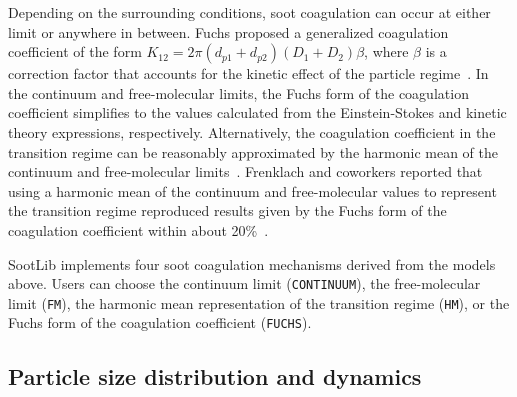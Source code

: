 \documentclass[preprint,letterpaper]{elsarticle}
\begin{document}
Depending on the surrounding conditions, soot coagulation can occur at either limit or anywhere in between. Fuchs proposed a generalized coagulation coefficient of the form $K_{12}=2\pi (d_{p1}+d_{p2})(D_1+D_2)\beta$, where $\beta$ is a correction factor that accounts for the kinetic effect of the particle regime~\cite{Fuchs_1964, Seinfeld_2016}. In the continuum and free-molecular limits, the Fuchs form of the coagulation coefficient simplifies to the values calculated from the Einstein-Stokes and kinetic theory expressions, respectively. Alternatively, the coagulation coefficient in the transition regime can be reasonably approximated by the harmonic mean of the continuum and free-molecular limits~\cite{Kazakov_1998,Frenklach_2002b}. Frenklach and coworkers reported that using a harmonic mean of the continuum and free-molecular values to represent the transition regime reproduced results given by the Fuchs form of the coagulation coefficient within about 20\%~\cite{Frenklach_2002b}.

SootLib implements four soot coagulation mechanisms derived from the models above. Users can choose the continuum limit (\texttt{CONTINUUM}), the free-molecular limit (\texttt{FM}), the harmonic mean representation of the transition regime (\texttt{HM}), or the Fuchs form of the coagulation coefficient (\texttt{FUCHS}).

\subsection{Particle size distribution and dynamics}
\label{ss:PSD_dynamics}
\end{document}
